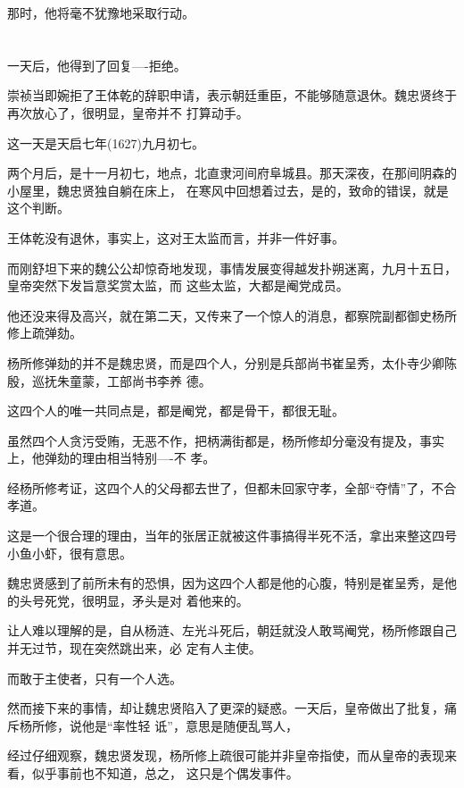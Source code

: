 \documentclass[11pt,a4paper,onecolumn]{article}
\begin{document}
那时，他将毫不犹豫地采取行动。

\section[\thesection]{}

一天后，他得到了回复----拒绝。

崇祯当即婉拒了王体乾的辞职申请，表示朝廷重臣，不能够随意退休。魏忠贤终于再次放心了，很明显，皇帝并不
打算动手。

这一天是天启七年(1627)九月初七。

两个月后，是十一月初七，地点，北直隶河间府阜城县。那天深夜，在那间阴森的小屋里，魏忠贤独自躺在床上，
在寒风中回想着过去，是的，致命的错误，就是这个判断。

王体乾没有退休，事实上，这对王太监而言，并非一件好事。

而刚舒坦下来的魏公公却惊奇地发现，事情发展变得越发扑朔迷离，九月十五日，皇帝突然下发旨意奖赏太监，而
这些太监，大都是阉党成员。

他还没来得及高兴，就在第二天，又传来了一个惊人的消息，都察院副都御史杨所修上疏弹劾。

杨所修弹劾的并不是魏忠贤，而是四个人，分别是兵部尚书崔呈秀，太仆寺少卿陈殷，巡抚朱童蒙，工部尚书李养
德。

这四个人的唯一共同点是，都是阉党，都是骨干，都很无耻。

虽然四个人贪污受贿，无恶不作，把柄满街都是，杨所修却分毫没有提及，事实上，他弹劾的理由相当特别----不
孝。

经杨所修考证，这四个人的父母都去世了，但都未回家守孝，全部``夺情''了，不合孝道。

这是一个很合理的理由，当年的张居正就被这件事搞得半死不活，拿出来整这四号小鱼小虾，很有意思。

魏忠贤感到了前所未有的恐惧，因为这四个人都是他的心腹，特别是崔呈秀，是他的头号死党，很明显，矛头是对
着他来的。

让人难以理解的是，自从杨涟、左光斗死后，朝廷就没人敢骂阉党，杨所修跟自己并无过节，现在突然跳出来，必
定有人主使。

而敢于主使者，只有一个人选。

然而接下来的事情，却让魏忠贤陷入了更深的疑惑。一天后，皇帝做出了批复，痛斥杨所修，说他是``率性轻
诋''，意思是随便乱骂人，

经过仔细观察，魏忠贤发现，杨所修上疏很可能并非皇帝指使，而从皇帝的表现来看，似乎事前也不知道，总之，
这只是个偶发事件。

\section[\thesection]{}
\end{document}
